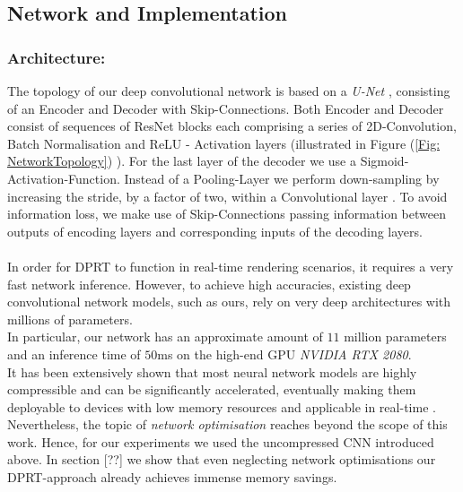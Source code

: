 \subsection{Network and Implementation }
\subsubsection*{Architecture: \\} 
The topology of our deep convolutional network is based on a \textit{U-Net}  \cite{U-Net}, consisting of an Encoder and Decoder with Skip-Connections. Both Encoder and Decoder consist of sequences of ResNet blocks \cite{ResNet} each comprising a series of 2D-Convolution, Batch Normalisation and ReLU - Activation layers (illustrated in Figure (\ref{Fig: NetworkTopology}) ). For the last layer of the decoder we use a Sigmoid-Activation-Function. Instead of a Pooling-Layer we perform down-sampling by increasing the stride, by a factor of two, within a Convolutional layer \cite{StridingConv}. To avoid information loss,  we make use of Skip-Connections passing information between outputs of encoding layers and corresponding inputs of the decoding layers. 
\\
\\
In order for DPRT to function in real-time rendering scenarios, it requires a very fast network inference. However, to achieve high accuracies, existing deep convolutional network models, such as ours, rely on very deep architectures with millions of parameters. 
\\
In particular, our network has an approximate amount of $11$ million parameters and an inference time of $50$ms on the high-end GPU \textit{NVIDIA RTX 2080}. 
\\
It has been extensively shown that most neural network models are highly compressible and can be significantly accelerated, eventually making them deployable to devices with low memory resources and applicable in real-time \cite{Deep_Compression, Survey_NN_Compression}.
\\
Nevertheless, the topic of \textit{network optimisation} reaches beyond the scope of this work. Hence, for our experiments we used the uncompressed CNN introduced above. In section [??] we show that even neglecting network optimisations our DPRT-approach already achieves immense memory savings. 
